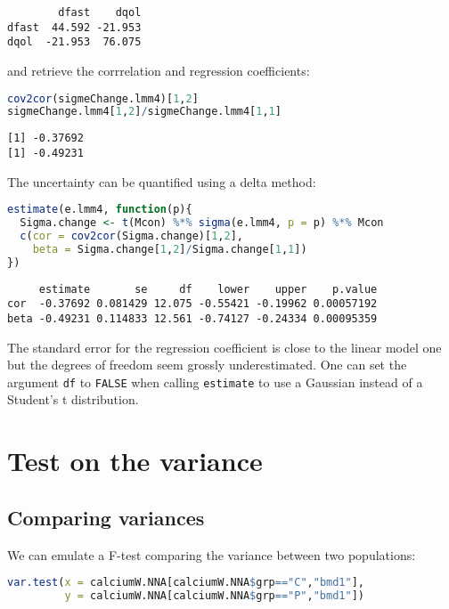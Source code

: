 \documentclass[12pt]{article}
\begin{document}
\label{}
\begin{verbatim}
        dfast    dqol
dfast  44.592 -21.953
dqol  -21.953  76.075
\end{verbatim}


and retrieve the corrrelation and regression coefficients:
\begin{lstlisting}[language=r,numbers=none]
cov2cor(sigmeChange.lmm4)[1,2]
sigmeChange.lmm4[1,2]/sigmeChange.lmm4[1,1]
\end{lstlisting}

\label{}
\begin{verbatim}
[1] -0.37692
[1] -0.49231
\end{verbatim}


The uncertainty can be quantified using a delta method:
\begin{lstlisting}[language=r,numbers=none]
estimate(e.lmm4, function(p){
  Sigma.change <- t(Mcon) %*% sigma(e.lmm4, p = p) %*% Mcon
  c(cor = cov2cor(Sigma.change)[1,2],
    beta = Sigma.change[1,2]/Sigma.change[1,1])
})
\end{lstlisting}

\label{}
\begin{verbatim}
     estimate       se     df    lower    upper    p.value
cor  -0.37692 0.081429 12.075 -0.55421 -0.19962 0.00057192
beta -0.49231 0.114833 12.561 -0.74127 -0.24334 0.00095359
\end{verbatim}


The standard error for the regression coefficient is close to the
linear model one but the degrees of freedom seem grossly
underestimated. One can set the argument \texttt{df} to \texttt{FALSE} when calling
\texttt{estimate} to use a Gaussian instead of a Student's t distribution.

\clearpage
\section{Test on the variance}
\label{sec:org0230009}

\subsection{Comparing variances}
\label{sec:org3cc7c12}

We can emulate a F-test comparing the variance between two populations:
\begin{lstlisting}[language=r,numbers=none]
var.test(x = calciumW.NNA[calciumW.NNA$grp=="C","bmd1"],
         y = calciumW.NNA[calciumW.NNA$grp=="P","bmd1"])
\end{lstlisting}
\end{document}
